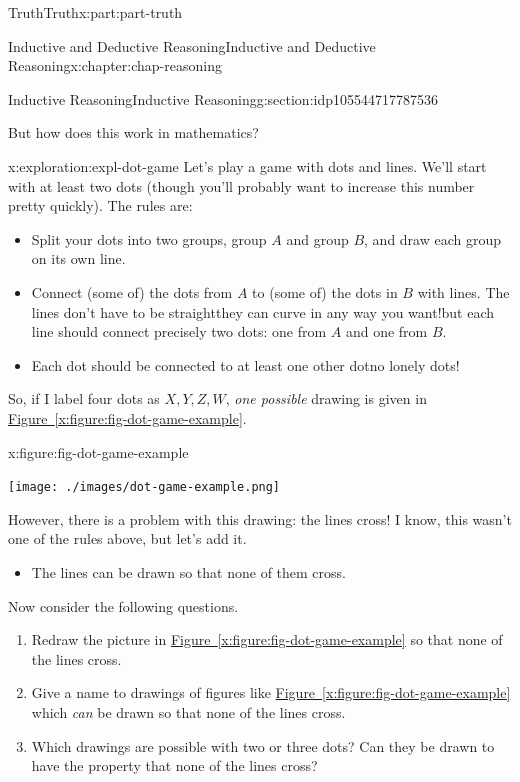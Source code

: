 \documentclass[oneside,10pt,]{book}
\newcommand{\xreffont}{\relax}
\numberwithin{equation}{section}
\begin{document}
\begin{partptx}{Truth}{}{Truth}{}{}{x:part:part-truth}
\begin{chapterptx}{Inductive and Deductive Reasoning}{}{Inductive and Deductive Reasoning}{}{}{x:chapter:chap-reasoning}
\begin{sectionptx}{Inductive Reasoning}{}{Inductive Reasoning}{}{}{g:section:idp105544717787536}
\par
But how does this work in mathematics?%
\begin{exploration}{}{x:exploration:expl-dot-game}%
Let's play a game with dots and lines. We'll start with at least two dots (though you'll probably want to increase this number pretty quickly). The rules are:%
%
\begin{itemize}[label=\textbullet]
\item{}Split your dots into two groups, group \(A\) and group \(B\), and draw each group on its own line.%
\item{}Connect (some of) the dots from \(A\) to (some of) the dots in \(B\) with lines. The lines don't have to be straight\textemdash{}they can curve in any way you want!\textemdash{}but each line should connect precisely two dots: one from \(A\) and one from \(B\).%
\item{}Each dot should be connected to at least one other dot\textemdash{}no lonely dots!%
\end{itemize}
So, if I label four dots as \(X, Y, Z, W\), \emph{one possible} drawing is given in \hyperref[x:figure:fig-dot-game-example]{Figure~{\xreffont\ref{x:figure:fig-dot-game-example}}}.%
\begin{figureptx}{}{x:figure:fig-dot-game-example}{}%
\begin{image}{0.325}{0.35}{0.325}%
\texttt{[image: ./images/dot-game-example.png]}
\end{image}%
\tcblower
\end{figureptx}%
However, there is a problem with this drawing: the lines cross! I know, this wasn't one of the rules above, but let's add it.%
%
\begin{itemize}[label=\textbullet]
\item{}The lines can be drawn so that none of them cross.%
\end{itemize}
Now consider the following questions.%
%
\begin{enumerate}
\item{}Redraw the picture in \hyperref[x:figure:fig-dot-game-example]{Figure~{\xreffont\ref{x:figure:fig-dot-game-example}}} so that none of the lines cross.%
\item{}Give a name to drawings of figures like \hyperref[x:figure:fig-dot-game-example]{Figure~{\xreffont\ref{x:figure:fig-dot-game-example}}} which \emph{can} be drawn so that none of the lines cross.%
\item{}Which drawings are possible with two or three dots? Can they be drawn to have the property that none of the lines cross?%

\end{enumerate}
\end{exploration}
\end{sectionptx}
\end{chapterptx}
\end{partptx}
\end{document}
